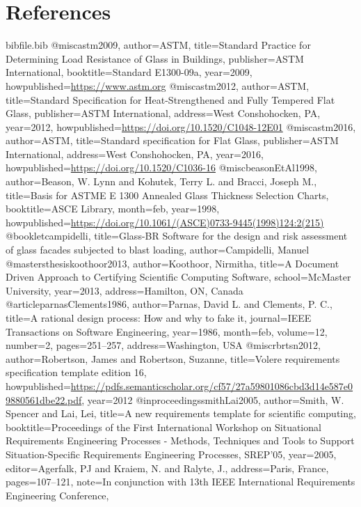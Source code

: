 \documentclass[12pt]{article}
\begin{document}
\section{References}
\label{Sec:References}
\begin{filecontents*}{bibfile.bib}
@misc{astm2009,
author={ASTM},
title={Standard Practice for Determining Load Resistance of Glass in Buildings},
publisher={ASTM International},
booktitle={Standard E1300-09a},
year={2009},
howpublished={\url{https://www.astm.org}}}
@misc{astm2012,
author={ASTM},
title={Standard Specification for Heat-Strengthened and Fully Tempered Flat Glass},
publisher={ASTM International},
address={West Conshohocken, PA},
year={2012},
howpublished={\url{https://doi.org/10.1520/C1048-12E01}}}
@misc{astm2016,
author={ASTM},
title={Standard specification for Flat Glass},
publisher={ASTM International},
address={West Conshohocken, PA},
year={2016},
howpublished={\url{https://doi.org/10.1520/C1036-16}}}
@misc{beasonEtAl1998,
author={Beason, W. Lynn and Kohutek, Terry L. and Bracci, Joseph M.},
title={Basis for ASTME E 1300 Annealed Glass Thickness Selection Charts},
booktitle={ASCE Library},
month=feb,
year={1998},
howpublished={\url{https://doi.org/10.1061/(ASCE)0733-9445(1998)124:2(215)}}}
@booklet{campidelli,
title={Glass-BR Software for the design and risk assessment of glass facades subjected to blast loading},
author={Campidelli, Manuel}}
@mastersthesis{koothoor2013,
author={Koothoor, Nirmitha},
title={A Document Driven Approach to Certifying Scientific Computing Software},
school={McMaster University},
year={2013},
address={Hamilton, ON, Canada}}
@article{parnasClements1986,
author={Parnas, David L. and Clements, P. C.},
title={A rational design process: How and why to fake it},
journal={IEEE Transactions on Software Engineering},
year={1986},
month=feb,
volume={12},
number={2},
pages={251--257},
address={Washington, USA}}
@misc{rbrtsn2012,
author={Robertson, James and Robertson, Suzanne},
title={Volere requirements specification template edition 16},
howpublished={\url{https://pdfs.semanticscholar.org/cf57/27a59801086cbd3d14e587e09880561dbe22.pdf}},
year={2012}}
@inproceedings{smithLai2005,
author={Smith, W. Spencer and Lai, Lei},
title={A new requirements template for scientific computing},
booktitle={Proceedings of the First International Workshop on Situational Requirements Engineering Processes - Methods, Techniques and Tools to Support Situation-Specific Requirements Engineering Processes, SREP'05},
year={2005},
editor={Agerfalk, PJ and Kraiem, N. and Ralyte, J.},
address={Paris, France},
pages={107--121},
note={In conjunction with 13th IEEE International Requirements Engineering Conference,}}
\end{filecontents*}
\nocite{*}
\printbibliography[heading=none]
\end{document}
